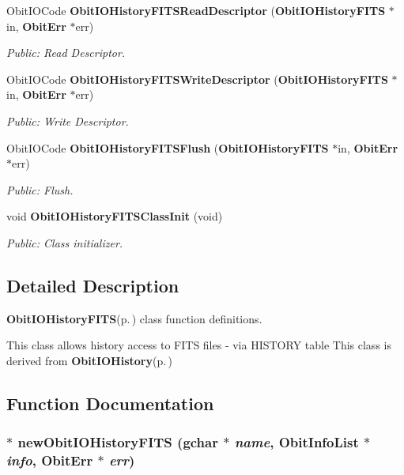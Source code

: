 \begin{CompactItemize}
Obit\-IOCode {\bf Obit\-IOHistory\-FITSRead\-Descriptor} ({\bf Obit\-IOHistory\-FITS} $\ast$in, {\bf Obit\-Err} $\ast$err)
\begin{CompactList}\small\item\em Public: Read Descriptor. \item\end{CompactList}\item 
Obit\-IOCode {\bf Obit\-IOHistory\-FITSWrite\-Descriptor} ({\bf Obit\-IOHistory\-FITS} $\ast$in, {\bf Obit\-Err} $\ast$err)
\begin{CompactList}\small\item\em Public: Write Descriptor. \item\end{CompactList}\item 
Obit\-IOCode {\bf Obit\-IOHistory\-FITSFlush} ({\bf Obit\-IOHistory\-FITS} $\ast$in, {\bf Obit\-Err} $\ast$err)
\begin{CompactList}\small\item\em Public: Flush. \item\end{CompactList}\item 
void {\bf Obit\-IOHistory\-FITSClass\-Init} (void)
\begin{CompactList}\small\item\em Public: Class initializer. \item\end{CompactList}\end{CompactItemize}


\subsection{Detailed Description}
{\bf Obit\-IOHistory\-FITS}{\rm (p.\,\pageref{structObitIOHistoryFITS})} class function definitions. 

This class allows history access to FITS files - via HISTORY table This class is derived from {\bf Obit\-IOHistory}{\rm (p.\,\pageref{structObitIOHistory})}

\subsection{Function Documentation}
\subsubsection{$\ast$ new\-Obit\-IOHistory\-FITS (gchar $\ast$ {\em name}, {\bf Obit\-Info\-List} $\ast$ {\em info}, {\bf Obit\-Err} $\ast$ {\em err})}\label{ObitIOHistoryFITS_8c_a7}


